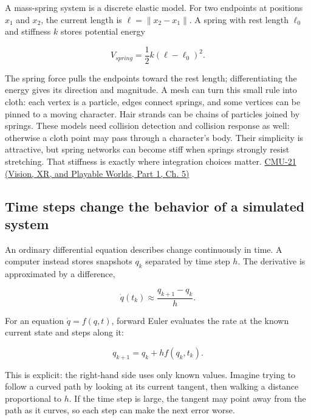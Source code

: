 A mass-spring system is a discrete elastic model. For two endpoints at positions \(x_1\) and \(x_2\), the current length is \(\ell=\|x_2-x_1\|\). A spring with rest length \(\ell_0\) and stiffness \(k\) stores potential energy

\[
V_{spring}=\frac12 k(\ell-\ell_0)^2.
\]

The spring force pulls the endpoints toward the rest length; differentiating the energy gives its direction and magnitude. A mesh can turn this small rule into cloth: each vertex is a particle, edges connect springs, and some vertices can be pinned to a moving character. Hair strands can be chains of particles joined by springs. These models need collision detection and collision response as well: otherwise a cloth point may pass through a character's body. Their simplicity is attractive, but spring networks can become stiff when springs strongly resist stretching. That stiffness is exactly where integration choices matter. \href{../07-Vision-XR-and-Playable-Worlds-P01/main.pdf\#nameddest=04-visual-computing-ii-ch036-cmu-21---dynamics-and-time-integration}{CMU-21 (Vision, XR, and Playable Worlds, Part 1, Ch. 5)}

\subsection{Time steps change the behavior of a simulated system}\label{04-visual-computing-ii-ch029-time-steps-change-the-behavior-of-a-simulated-system}

\hypertarget{04-visual-computing-ii-ch029-time-steps-change-the-behavior-of-a-simulated-system}{}

An ordinary differential equation describes change continuously in time. A computer instead stores snapshots \(q_k\) separated by time step \(h\). The derivative is approximated by a difference,

\[
\dot q(t_k)\approx\frac{q_{k+1}-q_k}{h}.
\]

For an equation \(\dot q=f(q,t)\), forward Euler evaluates the rate at the known current state and steps along it:

\[
q_{k+1}=q_k+h f(q_k,t_k).
\]

This is explicit: the right-hand side uses only known values. Imagine trying to follow a curved path by looking at its current tangent, then walking a distance proportional to \(h\). If the time step is large, the tangent may point away from the path as it curves, so each step can make the next error worse.

